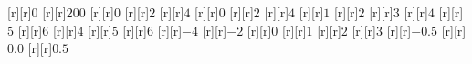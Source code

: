 \begin{psfrags}
[r][r]{$0$}%
[r][r]{$200$}%
[r][r]{$0$}%
[r][r]{$2$}%
[r][r]{$4$}%
[r][r]{$0$}%
[r][r]{$2$}%
[r][r]{$4$}%
[r][r]{$1$}%
[r][r]{$2$}%
[r][r]{$3$}%
[r][r]{$4$}%
[r][r]{$5$}%
[r][r]{$6$}%
[r][r]{$4$}%
[r][r]{$5$}%
[r][r]{$6$}%
[r][r]{$-4$}%
[r][r]{$-2$}%
[r][r]{$0$}%
[r][r]{$1$}%
[r][r]{$2$}%
[r][r]{$3$}%
[r][r]{$-0.5$}%
[r][r]{$0.0$}%
[r][r]{$0.5$}%
%
%
\end{psfrags}%
%
